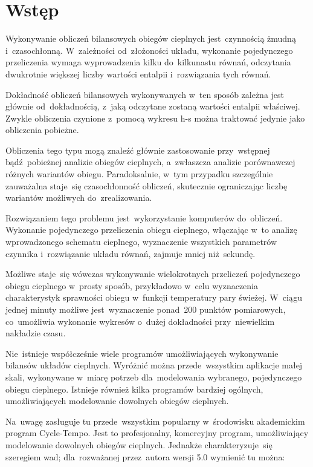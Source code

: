 \section{Wstęp}

Wykonywanie obliczeń bilansowych obiegów cieplnych jest~czynnością
żmudną i~czasochłonną. W~zależności od~złożoności układu, wykonanie
pojedynczego przeliczenia wymaga wyprowadzenia kilku do~kilkunastu
równań, odczytania dwukrotnie większej liczby wartości entalpii
i~rozwiązania tych równań.

Dokładność obliczeń bilansowych wykonywanych w~ten sposób zależna jest
głównie od~dokładnością, z~jaką odczytane zostaną wartości entalpii
właściwej. Zwykle obliczenia czynione z~pomocą wykresu h-s można
traktować jedynie jako obliczenia pobieżne.

Obliczenia tego typu mogą znaleźć głównie zastosowanie przy~wstępnej
bądź~pobieżnej analizie obiegów cieplnych, a~zwłaszcza analizie
porównawczej różnych wariantów obiegu. Paradoksalnie, w~tym przypadku
szczególnie zauważalna staje~się czasochłonność obliczeń, skutecznie
ograniczając liczbę wariantów możliwych do~zrealizowania.

Rozwiązaniem tego problemu jest~wykorzystanie komputerów do~obliczeń.
Wykonanie pojedynczego przeliczenia obiegu cieplnego, włączając w~to
analizę wprowadzonego schematu cieplnego, wyznaczenie wszystkich
parametrów czynnika i~rozwiązanie układu równań, zajmuje mniej
niż~sekundę.

Możliwe staje~się wówczas wykonywanie wielokrotnych przeliczeń
pojedynczego obiegu cieplnego w~prosty sposób, przykładowo w~celu
wyznaczenia charakterystyk sprawności obiegu w~funkcji temperatury pary
świeżej. W~ciągu jednej minuty możliwe jest~wyznaczenie ponad~200
punktów pomiarowych, co~umożliwia wykonanie wykresów o~dużej dokładności
przy~niewielkim nakładzie czasu.

Nie~istnieje współcześnie wiele programów umożliwiających wykonywanie
bilansów układów cieplnych. Wyróżnić można przede~wszystkim aplikacje
małej skali, wykonywane w~miarę potrzeb dla~modelowania wybranego,
pojedynczego obiegu cieplnego. Istnieje również kilka programów bardziej
ogólnych, umożliwiających modelowanie dowolnych obiegów cieplnych.

Na~uwagę zasługuje tu przede~wszystkim popularny w~środowisku
akademickim program Cycle-Tempo. Jest to profesjonalny, komercyjny
program, umożliwiający modelowanie dowolnych obiegów cieplnych. Jednakże
charakteryzuje~się szeregiem wad; dla~rozważanej przez~autora wersji 5.0
wymienić tu można:


